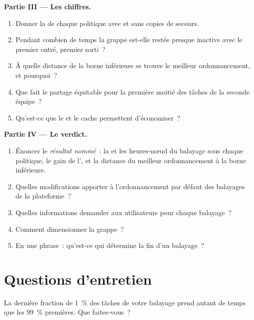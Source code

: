 \begin{problem}
\medskip\noindent\textbf{Partie III --- Les chiffres.}
\begin{enumerate}[resume]
\item Donner la  de chaque politique avec et sans copies de secours.
\item Pendant combien de temps la grappe est-elle restée presque inactive avec le premier entré, premier sorti~?
\item À quelle distance de la borne inférieure se trouve le meilleur ordonnancement, et pourquoi~?
\item Que fait le partage équitable pour la première moitié des tâches de la seconde équipe~?
\item Qu'est-ce que le  et le cache permettent d'économiser~?
\end{enumerate}

\medskip\noindent\textbf{Partie IV --- Le verdict.}
\begin{enumerate}[resume]
\item Énoncer le \emph{résultat nommé}~: la  et les heures-nœud du balayage sous chaque politique, le gain de l', et
la distance du meilleur ordonnancement à la borne inférieure.
\item Quelles modifications apporter à l'ordonnancement par défaut des balayages de la plateforme~?
\item Quelles informations demander aux utilisateurs pour chaque balayage~?
\item Comment dimensionner la grappe~?
\item En une phrase~: qu'est-ce qui détermine la fin d'un balayage~?
\end{enumerate}
\end{problem}

\section{Questions d'entretien}

\begin{interviewq}\label{iq:pl:distributed-compute-and-schedulers:1}
La dernière fraction de 1~\% des tâches de votre balayage prend autant de temps que les 99~\% premières. Que faites-vous~?
\end{interviewq}

